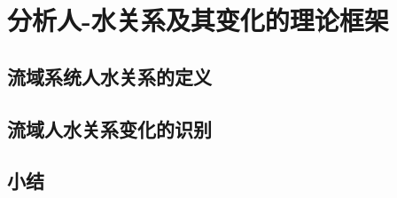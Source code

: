 \chapter{分析人-水关系及其变化的理论框架}\label{ch2:preface}


\section{流域系统人水关系的定义}\label{ch2:definitions}


\section{流域人水关系变化的识别}\label{ch2:dynamic}


\section{小结}\label{ch2:summary}

